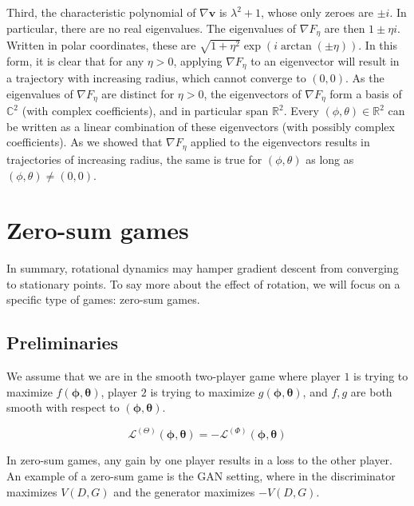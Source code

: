 \documentclass{article}
\renewcommand{\vec}[1]{\ensuremath{\boldsymbol{#1}}}
\newcommand{\vecfield}{\vec{v}}
\newcommand{\complex}{\mathbb{C}}
\newcommand{\phth}[0]{\ensuremath{(\boldsymbol{\phi}, \boldsymbol{\theta})}}
\begin{document}
\begin{eg}
    Third, the characteristic polynomial of $\nabla \vecfield$ is $\lambda^2 + 1$, whose only zeroes are $\pm i$. In particular, there are no real eigenvalues. The eigenvalues of $\nabla F_\eta$ are then $1 \pm \eta i$. Written in polar coordinates, these are $\sqrt{1 + \eta^2} \exp(i\arctan(\pm \eta))$. In this form, it is clear that for any $\eta > 0$, applying $\nabla F_\eta$ to an eigenvector will result in a trajectory with increasing radius, which cannot converge to $(0, 0)$. As the eigenvalues of $\nabla F_\eta$ are distinct for $\eta > 0$, the eigenvectors of $\nabla F_\eta$ form a basis of $\complex^2$ (with complex coefficients), and in particular span $\mathbb{R}^2$. Every $(\phi, \theta) \in \mathbb{R}^2$ can be written as a linear combination of these eigenvectors (with possibly complex coefficients). As we showed that $\nabla F_\eta$ applied to the eigenvectors results in trajectories of increasing radius, the same is true for $(\phi, \theta)$ as long as $(\phi, \theta) \neq (0, 0)$. 
\end{eg}

\section{Zero-sum games}
In summary, rotational dynamics may hamper gradient descent from converging to stationary points. To say more about the effect of rotation, we will focus on a specific type of games: zero-sum games.

\subsection{Preliminaries}

We assume that we are in the smooth two-player game where player $1$ is trying to maximize $f(\vec{\phi}, \vec{\theta})$, player $2$ is trying to maximize $g(\vec{\phi}, \vec{\theta})$, and $f,g$ are both smooth with respect to $\phth$.
\\
\begin{defn}
\[
    \mathcal{L}^{(\Theta)}(\vec{\phi},\vec{\theta}) = - \mathcal{L}^{(\Phi)}(\vec{\phi},\vec{\theta})
\]
\end{defn}
In zero-sum games, any gain by one player results in a loss to the other player. An example of a zero-sum game is the GAN setting, where in  the discriminator maximizes $V(D, G)$ and the generator maximizes $-V(D, G)$. \\
\end{document}
